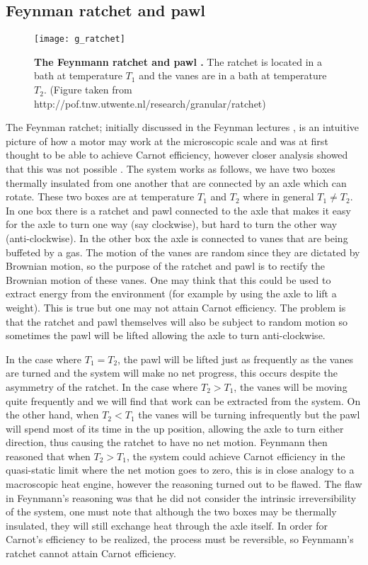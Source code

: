 \subsection{Feynman ratchet and pawl}
\begin{figure}
	\center
	\texttt{[image: g\_ratchet]}
	\caption{\textbf{The Feynmann ratchet and pawl \cite{Feynman1963}.} The ratchet is located in a bath at temperature $T_1$ and the vanes are in a bath at temperature $T_2$.  (Figure taken from http://pof.tnw.utwente.nl/research/granular/ratchet) \label{fig:feynmannRatchet}}
\end{figure}
The Feynman ratchet; initially discussed in the Feynman lectures \cite{Feynman1963}, is an intuitive picture of how a motor may work at the microscopic scale and was at first thought to be able to achieve Carnot efficiency, however closer analysis showed that this was not possible \cite{ParrondoEspanol1996}. The system works as follows, we have two boxes thermally insulated from one another that are connected by an axle which can rotate. These two boxes are at temperature $T_1$ and $T_2$ where in general $T_1 \neq T_2$. In one box there is a ratchet and pawl connected to the axle that makes it easy for the axle to turn one way (say clockwise), but hard to turn the other way (anti-clockwise). In the other box the axle is connected to vanes that are being buffeted by a gas. The motion of the vanes are random since they are dictated by Brownian motion, so the purpose of the ratchet and pawl is to rectify the Brownian motion of these vanes. One may think that this could be used to extract energy from the environment (for example by using the axle to lift a weight). This is true but one may not attain Carnot efficiency. The problem is that the ratchet and pawl themselves will also be subject to random motion so sometimes the pawl will be lifted allowing the axle to turn anti-clockwise.

In the case where $T_1 = T_2$, the pawl will be lifted just as frequently as the vanes are turned and the system will make no net progress, this occurs despite the asymmetry of the ratchet. In the case where $T_2 > T_1$, the vanes will be moving quite frequently and we will find that work can be extracted from the system. On the other hand, when $T_2 < T_1$ the vanes will be turning infrequently but the pawl will spend most of its time in the up position, allowing the axle to turn either direction, thus causing the ratchet to have no net motion. Feynmann then reasoned that when $T_2 > T_1$, the system could achieve Carnot efficiency in the quasi-static limit where the net motion goes to zero, this is in close analogy to a macroscopic heat engine, however the reasoning turned out to be flawed. The flaw in Feynmann's reasoning  was that he did not consider the intrinsic irreversibility of the system, one must note that although the two boxes may be thermally insulated, they will still exchange heat through the axle itself. In order for Carnot's efficiency to be realized, the process must be reversible, so Feynmann's ratchet cannot attain Carnot efficiency.  

